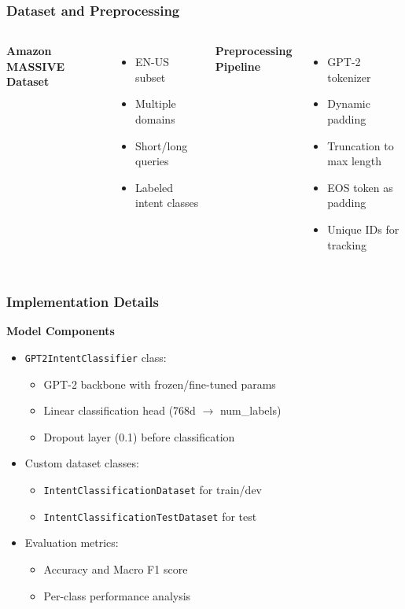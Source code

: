 \documentclass{beamer}
\begin{document}
\begin{frame}
\frametitle{Dataset and Preprocessing}
\begin{columns}
  \textbf{Amazon MASSIVE Dataset}
  \begin{itemize}
    \item EN-US subset
    \item Multiple domains
    \item Short/long queries
    \item Labeled intent classes
  \end{itemize}

  \textbf{Preprocessing Pipeline}
  \begin{itemize}
    \item GPT-2 tokenizer
    \item Dynamic padding
    \item Truncation to max length
    \item EOS token as padding
    \item Unique IDs for tracking
  \end{itemize}
\end{columns}
\end{frame}

\begin{frame}
\frametitle{Implementation Details}
\textbf{Model Components}
\begin{itemize}
  \item \texttt{GPT2IntentClassifier} class:
  \begin{itemize}
    \item GPT-2 backbone with frozen/fine-tuned params
    \item Linear classification head (768d $\rightarrow$ num\_labels)
    \item Dropout layer (0.1) before classification
  \end{itemize}
  \item Custom dataset classes:
  \begin{itemize}
    \item \texttt{IntentClassificationDataset} for train/dev
    \item \texttt{IntentClassificationTestDataset} for test
  \end{itemize}
  \item Evaluation metrics:
  \begin{itemize}
    \item Accuracy and Macro F1 score
    \item Per-class performance analysis
  \end{itemize}
\end{itemize}
\end{frame}
\end{document}
